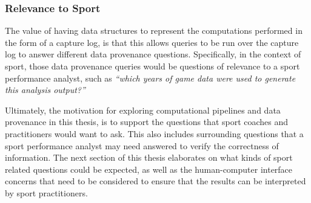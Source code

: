 
\subsubsection{Relevance to Sport}

The value of having data structures to represent the computations performed in the form of a capture log, is that this allows queries to be run over the capture log to answer different data provenance questions. Specifically, in the context of sport, those data provenance queries would be questions of relevance to a sport performance analyst, such as \textit{``which years of game data were used to generate this analysis output?''}

Ultimately, the motivation for exploring computational pipelines and data provenance in this thesis, is to support the questions that sport coaches and practitioners would want to ask. This also includes surrounding questions that a sport performance analyst may need answered to verify the correctness of information. The next section of this thesis elaborates on what kinds of sport related questions could be expected, as well as the human-computer interface concerns that need to be considered to ensure that the results can be interpreted by sport practitioners.
